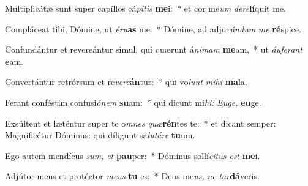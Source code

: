 \item Multiplicátæ sunt super capíllos cá\hspace{0.02em}\textit{pitis} \textbf{me}i:~* et cor me\textit{um} \textit{dere}\textbf{lí}quit me.
\item Compláceat tibi, Dómine, ut \textit{éru}\textbf{as} me:~* Dómine, ad adju\textit{vándum} \textit{me} \textbf{ré}spice.
\item Confundántur et revereántur simul, qui quærunt á\textit{nimam} \textbf{me}am,~* ut \textit{áuferant} \textbf{e}am.
\item Convertántur retrórsum et re\textit{vere}\textbf{án}tur:~* qui vo\textit{lunt} \textit{mihi} \textbf{ma}la.
\item Ferant conféstim confusi\textit{ónem} \textbf{su}am:~* qui dicunt mi\textit{hi:} \textit{Euge,} \textbf{eu}ge.
\item Exsúltent et læténtur super te o\textit{mnes} \textit{quæ}\textbf{rén}tes te:~* et dicant semper: Magnificétur Dóminus: qui díligunt sa\textit{lutáre} \textbf{tu}um.
\item Ego autem mendícus \textit{sum,} \textit{et} \textbf{pau}per:~* Dóminus sollí\textit{citus} \textit{est} \textbf{me}i.
\item Adjútor meus et protéctor \textit{meus} \textbf{tu} es:~* Deus me\textit{us,} \textit{ne} \textit{tar}\textbf{dá}veris.
